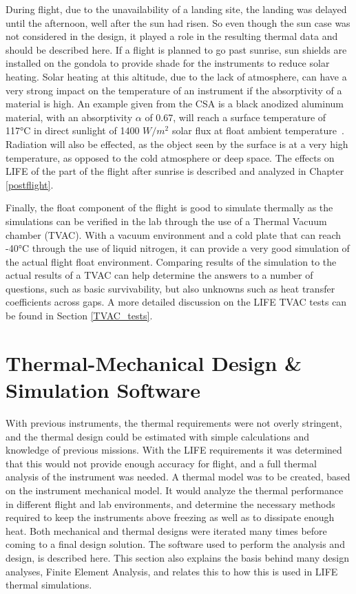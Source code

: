 During flight, due to the unavailability of a landing site, the landing was delayed until the afternoon, well after the sun had risen. So even though the sun case was not considered in the design, it played a role in the resulting thermal data and should be described here. If a flight is planned to go past sunrise, sun shields are installed on the gondola to provide shade for the instruments to reduce solar heating. Solar heating at this altitude, due to the lack of atmosphere, can have a very strong impact on the temperature of an instrument if the absorptivity of a material is high. An example given from the CSA is a black anodized aluminum material, with an absorptivity $\alpha$ of 0.67, will reach a surface temperature of 117°C in direct sunlight of 1400 $W/m^2$ solar flux at float ambient temperature~\citep{STRATOS_CARMENCITA_doc}. Radiation will also be effected, as the object seen by the surface is at a very high temperature, as opposed to the cold atmosphere or deep space. The effects on LIFE of the part of the flight after sunrise is described and analyzed in Chapter \ref{postflight}.

Finally, the float component of the flight is good to simulate thermally as the simulations can be verified in the lab through the use of a Thermal Vacuum chamber (TVAC). With a vacuum environment and a cold plate that can reach -40°C through the use of liquid nitrogen, it can provide a very good simulation of the actual flight float environment. Comparing results of the simulation to the actual results of a TVAC can help determine the answers to a number of questions, such as basic survivability, but also unknowns such as heat transfer coefficients across gaps. A more detailed discussion on the LIFE TVAC tests can be found in Section \ref{TVAC_tests}.

\section{Thermal-Mechanical Design \& Simulation Software}\label{thermal_sim_sw_sec}
With previous instruments, the thermal requirements were not overly stringent, and the thermal design could be estimated with simple calculations and knowledge of previous missions. With the LIFE requirements it was determined that this would not provide enough accuracy for flight, and a full thermal analysis of the instrument was needed. A thermal model was to be created, based on the instrument mechanical model. It would analyze the thermal performance in different flight and lab environments, and determine the necessary methods required to keep the instruments above freezing as well as to dissipate enough heat. Both mechanical and thermal designs were iterated many times before coming to a final design solution. The software used to perform the analysis and design, is described here. This section also explains the basis behind many design analyses, Finite Element Analysis, and relates this to how this is used in LIFE thermal simulations.


